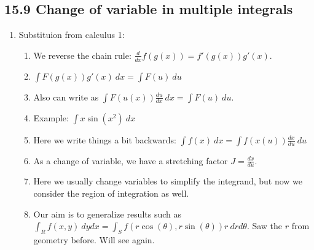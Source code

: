 \documentclass{article}
\newcommand{\ds}{\displaystyle}
\begin{document}
\subsection{15.9 Change of variable in multiple integrals}

\begin{enumerate}

\item Substituion from calculus 1:
\begin{enumerate}
\item We reverse the chain rule: $\frac{d}{dx} f(g(x)) = f'(g(x)) g'(x)$. 
\item $\ds \int F(g(x)) g'(x) ~dx = \int F(u) ~du$
\item Also can write as $\int F(u(x)) \frac{du}{dx} ~dx = \int F(u) ~du$.
\item Example: $\int x\sin(x^2)~dx$
\item Here we write things a bit backwards: $\ds \int f(x) ~dx = \int f(x(u)) \frac{dx}{du} ~du$
\item As a change of variable, we have a stretching factor $J = \frac{dx}{du}$.
\item Here we usually change variables to simplify the integrand, but now we consider the region of integration as well.
\item Our aim is to generalize results such as $\ds \int_R f(x,y)~dydx = \int_S f(r\cos(\theta), r\sin(\theta)) r ~drd\theta$. Saw the $r$ from geometry before. Will see again.
\end{enumerate}


\end{enumerate}
\end{document}
